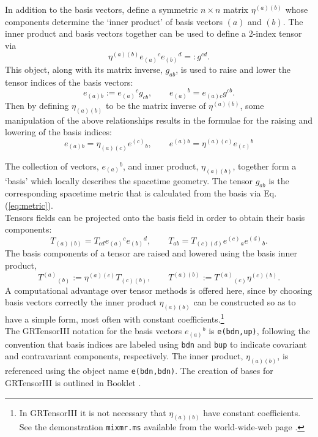 \documentclass{article}
\begin{document}
In addition to the basis vectors, define a symmetric $n\times n$
matrix $\eta^{(a)(b)}$ whose components determine the `inner
product' of basis vectors $(a)$ and $(b)$. The inner product and basis
vectors together can be used to define a 2-index tensor via
\begin{equation}
  \eta^{(a)(b)} e_{(a)}{}^c e_{(b)}{}^d =: g^{cd}.
  \label{eq:metric}
\end{equation}
This object, along with its matrix inverse, $g_{ab}$, is used to raise
and lower the tensor indices of the basis vectors:
\[
  e_{(a)b} := e_{(a)}{}^c g_{cb}, \qquad e_{(a)}{}^b = e_{(a)c} g^{cb}.
\]
Then by defining $\eta_{(a)(b)}$ to be the matrix inverse of
$\eta^{(a)(b)}$, some manipulation of the above relationships results
in the formulae for the raising and lowering of the basis indices:
\[
  e_{(a)b} = \eta_{(a)(c)} e^{(c)}{}_b, \qquad e^{(a)}{}^b =
  \eta^{(a)(c)} e_{(c)}{}^b
\] 

The collection of vectors, $e_{(a)}{}^b$, and inner product,
$\eta_{(a)(b)}$, together form a `basis' which locally describes the
spacetime geometry. The tensor $g_{ab}$ is the corresponding spacetime
metric that is calculated from the basis via Eq. (\ref{eq:metric}).\\

Tensors fields can be projected onto the basis field in order to
obtain their basis components:
\[
  T_{(a)(b)} = T_{cd} e_{(a)}{}^c e_{(b)}{}^d, \qquad
  T_{ab} = T_{(c)(d)} e^{(c)}{}_a e^{(d)}{}_b.
\]
The basis components of a tensor are raised and lowered
using the basis inner product,
\[
  T^{(a)}{}_{(b)} := \eta^{(a)(c)} T_{(c)(b)}, \qquad T^{(a)(b)} :=
  T^{(a)}{}_{(c)} \eta^{(c)(b)}.
\]
A computational advantage over tensor methods is offered here, since
by choosing basis vectors correctly the inner product $\eta_{(a)(b)}$
can be constructed so as to have a simple form, most often with
constant coefficients.\footnote{In GRTensorIII it is not necessary that
$\eta_{(a)(b)}$ have constant coefficients. See the demonstration
\texttt{mixmr.ms} available from the world-wide-web page
\cite{www}.}\\

The GRTensorIII notation for the basis vectors $e_{(a)}{}^b$ is
\texttt{e(bdn,up)}, following the convention that basis indices are
labeled using \texttt{bdn} and \texttt{bup} to indicate covariant and
contravariant components, respectively. The inner product,
$\eta_{(a)(b)}$, is referenced using the object name
\texttt{e(bdn,bdn)}. The creation of bases for GRTensorIII is outlined
in Booklet \grMakegRef.\\
\end{document}

